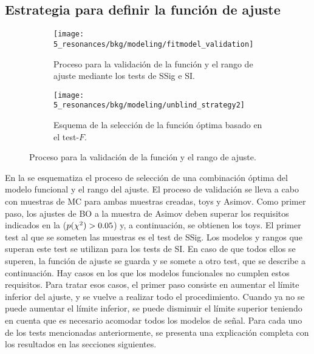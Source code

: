 \subsection{Estrategia para definir la función de ajuste}
\label{subsec:bkg:modeling:strategy}


\begin{figure}[ht!]
    \centering
    \begin{subfigure}[t]{0.49\linewidth}
        \centering
        \texttt{[image: 5\_resonances/bkg/modeling/fitmodel\_validation]}
        \caption{Proceso para la validación de la función y el rango de ajuste mediante los tests de \ac{SSig} e \ac{SI}.}
        \label{fig:bkg:modeling:strategy:validation:tests}
    \end{subfigure}
    \hfill
    \begin{subfigure}[t]{0.49\linewidth}
        \centering
        \texttt{[image: 5\_resonances/bkg/modeling/unblind\_strategy2]}
        \caption{Esquema de la selección de la función óptima basado en el test-\(F\).}
        \label{fig:bkg:modeling:strategy:validation:function_selection}
    \end{subfigure}
    \caption{Proceso para la validación de la función y el rango de ajuste.}
    \label{fig:bkg:modeling:strategy:validation}
\end{figure}

En la \Fig{\ref{fig:bkg:modeling:strategy:validation:tests}} se esquematiza el proceso de selección de una combinación óptima del modelo funcional y el rango del ajuste.
El proceso de validación se lleva a cabo con muestras de \ac{MC} para ambas muestras creadas, toys y Asimov. Como primer paso, los ajustes de \ac{BO} a la muestra de Asimov deben superar los requisitos indicados en la \Fig{\ref{fig:bkg:modeling:preparation:datasets_generation}} (\(p(\chi^{2}) > 0.05\)) y, a continuación, se obtienen los toys. El primer test al que se someten las muestras es el test de \acf{SSig}. Los modelos y rangos que superan este test se utilizan para los tests de \acf{SI}. En caso de que todos ellos se superen, la función de ajuste se guarda y se somete a otro test, que se describe a continuación. Hay casos en los que los modelos funcionales no cumplen estos requisitos. Para tratar esos casos, el primer paso consiste en aumentar el límite inferior del ajuste, y se vuelve a realizar todo el procedimiento. Cuando ya no se puede aumentar el límite inferior, se puede disminuir el límite superior teniendo en cuenta que es necesario acomodar todos los modelos de señal. Para cada uno de los tests mencionadas anteriormente, se presenta una explicación completa con los resultados en las secciones siguientes.

